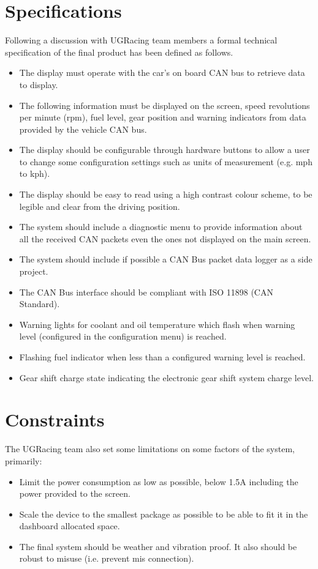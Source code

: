 \documentclass[11pt]{report} %
\begin{document}
			
	\section{Specifications}
	Following a discussion with UGRacing team members a formal technical
	specification of the final product has been defined as follows.
	
	\begin{itemize}
		\item The display must operate with the car's on board CAN bus to
		retrieve data to display.
		\item The following information must be displayed on the screen, speed
		revolutions per minute (rpm), fuel level, gear position and warning
		indicators from data provided by the vehicle CAN bus.
		\item The display should be configurable through hardware buttons to 
		allow a user to change some configuration settings such as units of
		measurement (e.g. mph to kph).
		\item The display should be easy to read using a high contrast colour
		scheme, to be legible and clear from the driving position.
		\item The system should include a diagnostic menu to provide 
		information about all the received CAN packets even the ones not 
		displayed on the main screen.
		\item The system should include if possible a CAN Bus packet data 
		logger as a side project.
		\item The CAN Bus interface should be compliant with ISO 11898
		(CAN Standard).
		\item Warning lights for coolant and oil temperature which flash when
		warning level (configured in the configuration menu) is reached.
		\item Flashing fuel indicator when less than a configured warning level
		is reached.
		\item Gear shift charge state indicating the electronic gear shift
		system charge level.
	\end{itemize}
	
	\section{Constraints}
	The UGRacing team also set some limitations on some factors of the system,
	primarily:
	
	\begin{itemize}
		\item Limit the power consumption as low as possible, below 1.5A
		including the power provided to the screen.
		\item Scale the device to the smallest package as possible to be able
		to fit it in the dashboard allocated space.
		\item The final system should be weather and vibration proof. It also
		should be robust to misuse (i.e. prevent mis connection).
	\end{itemize}
\end{document}
